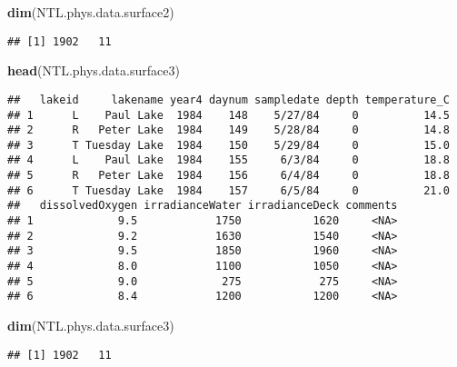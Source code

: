 \documentclass[]{article}
\newenvironment{Shaded}{\begin{snugshade}}{\end{snugshade}}
\newcommand{\KeywordTok}[1]{\textcolor[rgb]{0.13,0.29,0.53}{\textbf{#1}}}
\newcommand{\CommentTok}[1]{\textcolor[rgb]{0.56,0.35,0.01}{\textit{#1}}}
\newcommand{\OperatorTok}[1]{\textcolor[rgb]{0.81,0.36,0.00}{\textbf{#1}}}
\newcommand{\NormalTok}[1]{#1}
\begin{document}
\begin{Shaded}
\begin{Highlighting}[]
\KeywordTok{dim}\NormalTok{(NTL.phys.data.surface2)}
\end{Highlighting}
\end{Shaded}

\begin{verbatim}
## [1] 1902   11
\end{verbatim}

\begin{Shaded}
\begin{Highlighting}[]
\KeywordTok{head}\NormalTok{(NTL.phys.data.surface3)}
\end{Highlighting}
\end{Shaded}

\begin{verbatim}
##   lakeid     lakename year4 daynum sampledate depth temperature_C
## 1      L    Paul Lake  1984    148    5/27/84     0          14.5
## 2      R   Peter Lake  1984    149    5/28/84     0          14.8
## 3      T Tuesday Lake  1984    150    5/29/84     0          15.0
## 4      L    Paul Lake  1984    155     6/3/84     0          18.8
## 5      R   Peter Lake  1984    156     6/4/84     0          18.8
## 6      T Tuesday Lake  1984    157     6/5/84     0          21.0
##   dissolvedOxygen irradianceWater irradianceDeck comments
## 1             9.5            1750           1620     <NA>
## 2             9.2            1630           1540     <NA>
## 3             9.5            1850           1960     <NA>
## 4             8.0            1100           1050     <NA>
## 5             9.0             275            275     <NA>
## 6             8.4            1200           1200     <NA>
\end{verbatim}

\begin{Shaded}
\begin{Highlighting}[]
\KeywordTok{dim}\NormalTok{(NTL.phys.data.surface3)}
\end{Highlighting}
\end{Shaded}

\begin{verbatim}
## [1] 1902   11
\end{verbatim}

\begin{Shaded}
\end{Shaded}
\end{document}
